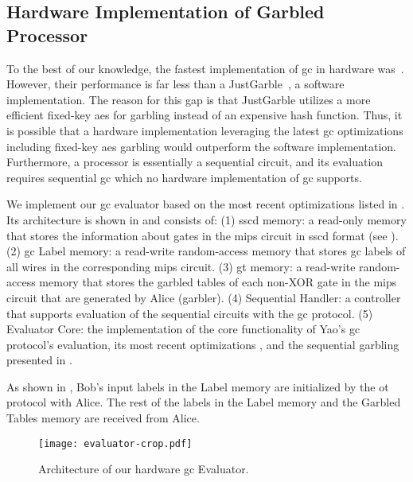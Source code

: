 \subsection{Hardware Implementation of Garbled Processor} \label{ssec:processor-hardware}
To the best of our knowledge, the fastest implementation of \acrshort{gc} in hardware was~\cite{jarvinen2010garbled}.
However, their performance is far less than a JustGarble~\cite{bellare2013efficient}, a software implementation.
The reason for this gap is that JustGarble utilizes a more efficient fixed-key \acrshort{aes} for garbling instead of an expensive hash function.
Thus, it is possible that a hardware implementation leveraging the latest \acrshort{gc} optimizations including fixed-key \acrshort{aes} garbling would outperform the software implementation.
Furthermore, a processor is essentially a sequential circuit, and its evaluation requires sequential \acrshort{gc} which no hardware implementation of \acrshort{gc} supports.

We implement our \acrshort{gc} evaluator based on the most recent optimizations listed in .
Its architecture is shown in  and consists of:
(1) \acrfull{sscd} memory: a read-only memory that stores the information about gates in the \gls{mips} circuit in \acrshort{sscd} format (see ).
(2) \acrshort{gc} Label memory: a read-write random-access memory that stores \acrshort{gc} labels of all wires in the corresponding \gls{mips} circuit.
(3) \acrfull{gt} memory: a read-write random-access memory that stores the garbled tables of each non-XOR gate in the \gls{mips} circuit that are generated by Alice (garbler).
(4) Sequential Handler: a controller that supports evaluation of the sequential circuits with the \acrshort{gc} protocol.
(5) Evaluator Core: the implementation of the core functionality of Yao’s \acrshort{gc} protocol's evaluation, its most recent optimizations \cite{kolesnikov2008improved, bellare2013efficient, zahur2015two}, and the sequential garbling presented in .

As shown in , Bob's input labels in the Label memory are initialized by the \acrshort{ot} protocol with Alice.
The rest of the labels in the Label memory and the Garbled Tables memory are received from Alice.

\begin{figure}
\centering
\texttt{[image: evaluator-crop.pdf]}
\caption{Architecture of our hardware \acrshort{gc} Evaluator.}
\label{fig:evaluator}
\end{figure}

